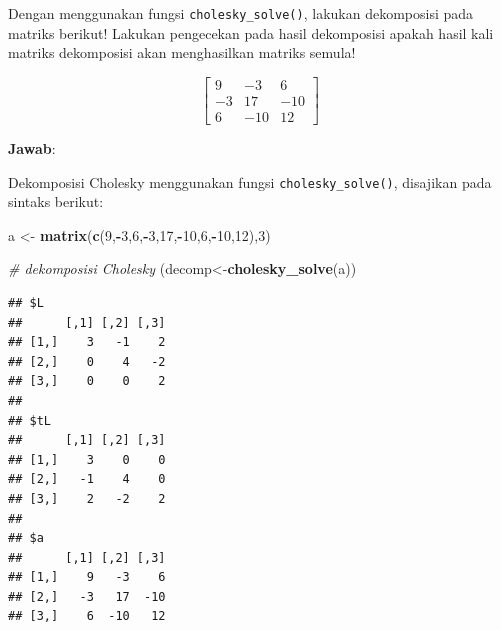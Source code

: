 \documentclass[]{book}
\newenvironment{Shaded}{\begin{snugshade}}{\end{snugshade}}
\newcommand{\CommentTok}[1]{\textcolor[rgb]{0.56,0.35,0.01}{\textit{#1}}}
\newcommand{\DecValTok}[1]{\textcolor[rgb]{0.00,0.00,0.81}{#1}}
\newcommand{\KeywordTok}[1]{\textcolor[rgb]{0.13,0.29,0.53}{\textbf{#1}}}
\newcommand{\NormalTok}[1]{#1}
\newcommand{\OperatorTok}[1]{\textcolor[rgb]{0.81,0.36,0.00}{\textbf{#1}}}
\newcommand{\StringTok}[1]{\textcolor[rgb]{0.31,0.60,0.02}{#1}}
\theoremstyle{definition}
\theoremstyle{definition}
\theoremstyle{definition}
\theoremstyle{remark}
\let\BeginKnitrBlock\begin \let\EndKnitrBlock\end
\begin{document}
\BeginKnitrBlock{example}
\protect\hypertarget{exm:cholexm2}{}{\label{exm:cholexm2} }Dengan menggunakan fungsi \texttt{cholesky\_solve()}, lakukan dekomposisi pada matriks berikut! Lakukan pengecekan pada hasil dekomposisi apakah hasil kali matriks dekomposisi akan menghasilkan matriks semula!
\EndKnitrBlock{example}

\[
\begin{bmatrix}
     9         & -3       & 6                  \\[0.3em]
     -3         & 17       & -10                   \\[0.3em]
     6         & -10      & 12                  
\end{bmatrix}
\]

\textbf{Jawab}:

Dekomposisi Cholesky menggunakan fungsi \texttt{cholesky\_solve()}, disajikan pada sintaks berikut:

\begin{Shaded}
\begin{Highlighting}[]
\NormalTok{a <-}\StringTok{ }\KeywordTok{matrix}\NormalTok{(}\KeywordTok{c}\NormalTok{(}\DecValTok{9}\NormalTok{,}\OperatorTok{-}\DecValTok{3}\NormalTok{,}\DecValTok{6}\NormalTok{,}\OperatorTok{-}\DecValTok{3}\NormalTok{,}\DecValTok{17}\NormalTok{,}\OperatorTok{-}\DecValTok{10}\NormalTok{,}\DecValTok{6}\NormalTok{,}\OperatorTok{-}\DecValTok{10}\NormalTok{,}\DecValTok{12}\NormalTok{),}\DecValTok{3}\NormalTok{)}

\CommentTok{# dekomposisi Cholesky}
\NormalTok{(decomp<-}\KeywordTok{cholesky_solve}\NormalTok{(a))}
\end{Highlighting}
\end{Shaded}

\begin{verbatim}
## $L
##      [,1] [,2] [,3]
## [1,]    3   -1    2
## [2,]    0    4   -2
## [3,]    0    0    2
## 
## $tL
##      [,1] [,2] [,3]
## [1,]    3    0    0
## [2,]   -1    4    0
## [3,]    2   -2    2
## 
## $a
##      [,1] [,2] [,3]
## [1,]    9   -3    6
## [2,]   -3   17  -10
## [3,]    6  -10   12
\end{verbatim}

\begin{Shaded}
\end{Shaded}
\end{document}
